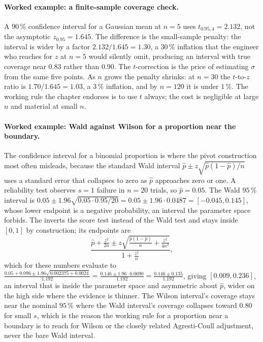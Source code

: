 \paragraph{Worked example: a finite-sample coverage check.}
A $90\,\%$ confidence interval for a Gaussian mean at $n = 5$ uses
$t_{0.95, 4} = 2.132$, not the asymptotic $z_{0.95} = 1.645$. The
difference is the small-sample penalty: the interval is wider by a
factor $2.132/1.645 = 1.30$, a $30\,\%$ inflation that the engineer
who reaches for $z$ at $n = 5$ would silently omit, producing an
interval with true coverage near $0.83$ rather than $0.90$. The
$t$-correction is the price of estimating $\sigma$ from the same
five points. As $n$ grows the penalty shrinks: at $n = 30$ the
$t$-to-$z$ ratio is $1.70/1.645 = 1.03$, a $3\,\%$ inflation, and
by $n = 120$ it is under $1\,\%$. The working rule the chapter
endorses is to use $t$ always; the cost is negligible at large $n$
and material at small $n$.

\paragraph{Worked example: Wald against Wilson for a proportion near
the boundary.} The confidence interval for a binomial proportion is
where the pivot construction most often misleads, because the standard
Wald interval $\hat{p} \pm z\sqrt{\hat{p}(1-\hat{p})/n}$ uses a
standard error that collapses to zero as $\hat{p}$ approaches zero or
one. A reliability test observes $s = 1$ failure in $n = 20$ trials,
so $\hat{p} = 0.05$. The Wald $95\,\%$ interval is $0.05 \pm 1.96
\sqrt{0.05 \cdot 0.95/20} = 0.05 \pm 1.96 \cdot 0.0487 = [-0.045,
0.145]$, whose lower endpoint is a negative probability, an interval
the parameter space forbids. The  inverts the
score test instead of the Wald test and stays inside $[0, 1]$ by
construction; its endpoints are
\[
\frac{\hat{p} + \frac{z^{2}}{2n} \pm z\sqrt{\frac{\hat{p}(1-\hat{p})}{n}
+ \frac{z^{2}}{4n^{2}}}}{1 + \frac{z^{2}}{n}},
\]
which for these numbers evaluate to
$\frac{0.05 + 0.096 \pm 1.96\sqrt{0.002375 + 0.0024}}{1.192} =
\frac{0.146 \pm 1.96 \cdot 0.0690}{1.192} = \frac{0.146 \pm 0.135}
{1.192}$, giving $[0.009, 0.236]$, an interval that is inside the
parameter space and asymmetric about $\hat{p}$, wider on the high side
where the evidence is thinner. The Wilson interval's coverage stays
near the nominal $95\,\%$ where the Wald interval's coverage collapses
toward $0.80$ for small $s$, which is the reason the working rule for a
proportion near a boundary is to reach for Wilson or the closely
related Agresti-Coull adjustment, never the bare Wald interval.

